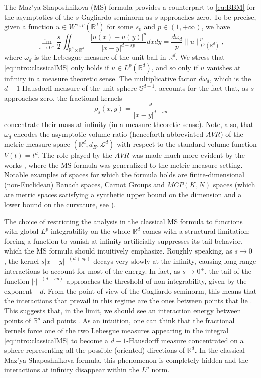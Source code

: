 \documentclass[reqno,11pt]{amsart}
\numberwithin{equation}{section}
\theoremstyle{definition} %
\theoremstyle{plain}
\theoremstyle{definition}
\theoremstyle{remark}
\def\elle#1{L^{#1}}
\def\Sd{{\mathbb{S}^{d-1}}}
\def\o{\omega}
\def\norma#1#2{ \|#1 \|_{#2}}
\def\R{\mathbb{R}}
\def\Rd{\mathbb{R}^d}
\newcommand{\abs}[1]{\left|#1\right|}
\begin{document}
{The Maz'ya-Shaposhnikova (MS) formula \cite{MazyaShaposhnikova2002} provides a counterpart to \eqref{eq:BBM} for the asymptotics of the $s$-Gagliardo seminorm as $s$ approaches zero.
To be precise, given a function $u\in W^{s_0,p}(\R^d)$ for some $s_0$ and $p\in(1,+\infty)$, we have
\begin{equation}
\label{eq:intro:classicalMS}
    \lim_{s\to0^+} \frac{s}{2}\iint_{\R^d\times \R^d} \frac{\abs{u(x)-u(y)}^p}{\abs{x-y}^{d+sp}}dxdy=\frac{d\omega_d}{p}\norma{u}{\elle p(\R^d)}^p,
\end{equation}
where $\omega_d$ is the Lebesgue measure of the unit ball in $\R^d$. We stress that \eqref{eq:intro:classicalMS} only holds if $u\in L^p(\R^d)$, and so only if $u$ vanishes at infinity in a measure theoretic sense. The multiplicative factor $d\o_d$, which is the $d-1$ Hausdorff measure of the unit sphere $\Sd$, accounts for the fact that, as $s$ approaches zero, the fractional kernels
\[
\rho_s(x,y)=\frac{s}{\abs{x-y}^{d+sp}}
\]
concentrate their mass at infinity (in a measure-theoretic sense). 
Note, also, that $\omega_d$ encodes the asymptotic volume ratio (henceforth abbreviated $AVR$) of the metric measure space $(\Rd,d_{E},\mathcal{L}^d)$ with respect to the standard volume function $V(t)=t^d$.
The role played by the $AVR$ was made much more evident by the works \cite{Han-MS&BBM,HanPinamontiXu2025,HanPinamontirigidity}, where the MS formula was generalized to the metric measure setting. Notable examples of spaces for which the formula holds are finite-dimensional (non-Euclidean) Banach spaces, Carnot Groups and $MCP(K,N)$ spaces (which are metric spaces satisfying a synthetic upper bound on the dimension and a lower bound on the curvature, see \cite{Ohta2007MCP,Sturm2006II}).

The choice of restricting the analysis in the classical MS formula to functions with global $L^p$-integrability on the whole $\R^d$ comes with a structural limitation: forcing a function to vanish at infinity artificially suppresses its tail behavior, which the MS formula should intuitively emphasize. Roughly speaking, as $s\to0^+$, the kernel $s\abs{x-y}^{-(d+sp)}$ decays very slowly at the infinity, causing long-range interactions to account for most of the energy. 
In fact, as $s\to0^+$, the tail of the function $\abs{\cdot}^{-(d+sp)}$ approaches the threshold of non integrability, given by the exponent $-d$. From the point of view of the Gagliardo seminorm, this means that the interactions that prevail in this regime are the ones between points that lie . This suggests that, in the limit, we should see an interaction energy between points of $\R^d$ and points . As an intuition, one can think that the fractional kernels force one of the two Lebesgue measures appearing in the integral \eqref{eq:intro:classicalMS} to become a $d-1$-Hausdorff measure concentrated on a sphere representing all the possible (oriented) directions of $\R^d$. In the classical Maz'ya-Shaposhnikova formula, this phenomenon is completely hidden and the interactions at infinity disappear within the $\elle p $ norm. 

}
\end{document}
